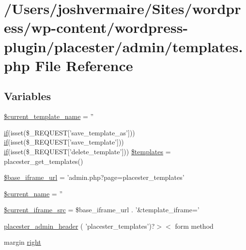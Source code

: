 \hypertarget{templates_8php}{
\section{/Users/joshvermaire/Sites/wordpress/wp-\/content/wordpress-\/plugin/placester/admin/templates.php File Reference}
\label{dd/db0/templates_8php}
}
\subsection*{Variables}
\begin{DoxyCompactItemize}
\item 
\hyperlink{templates_8php_a5b5bec8b632991a1b30093383b29efdd}{\$current\_\-template\_\-name} = ''
\item 
\hyperlink{listings__list__lone__divbased_8php_a0b49fff73af3a13232913ea65ca484d9}{if}(isset(\$\_\-REQUEST\mbox{[}'save\_\-template\_\-as'\mbox{]})) \hyperlink{listings__list__lone__divbased_8php_a0b49fff73af3a13232913ea65ca484d9}{if}(isset(\$\_\-REQUEST\mbox{[}'save\_\-template'\mbox{]})) \hyperlink{listings__list__lone__divbased_8php_a0b49fff73af3a13232913ea65ca484d9}{if}(isset(\$\_\-REQUEST\mbox{[}'delete\_\-template'\mbox{]})) \hyperlink{templates_8php_a29344aedac519f2779920e863d0c6214}{\$templates} = placester\_\-get\_\-templates()
\item 
\hyperlink{templates_8php_a3c5dba6f7237d5d2286c177ae89e5d71}{\$base\_\-iframe\_\-url} = 'admin.php?page=placester\_\-templates'
\item 
\hyperlink{templates_8php_aeb3b3063588b48b25fc5833245f12067}{\$current\_\-name} = ''
\item 
\hyperlink{templates_8php_a82a47bfb0d30eef92537f3833f9a0fb4}{\$current\_\-iframe\_\-src} = \$base\_\-iframe\_\-url . '\&template\_\-iframe='
\item 
\hyperlink{templates_8php_af51fa061597b946ccd6f6bf5122eafe2}{placester\_\-admin\_\-header} ( 'placester\_\-templates')?$>$$<$ form method
\item 
margin \hyperlink{templates_8php_a9f3a98abc04200d1bbe440663d9aba96}{right}
\end{DoxyCompactItemize}


